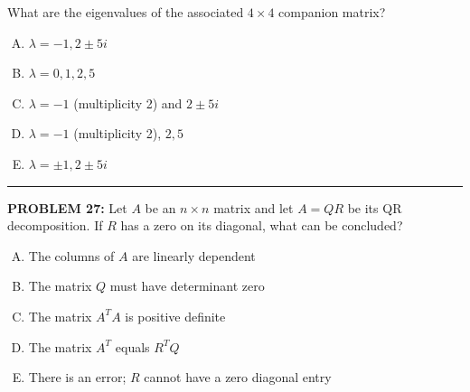 \documentclass[12pt]{amsart}
\newcommand{\divider}{
  \vspace{-1em} %
  \noindent
  \raisebox{-0.15ex}{\textbullet}%
  \hspace{0.5em}%
  \rule[0.5ex]{0.95\textwidth}{1.0pt}%
  \hspace{0.5em}%
  \raisebox{-0.15ex}{\textbullet}%
  \vspace{0em} %
}
\begin{document}
{What are the eigenvalues of the associated $4 \times 4$ companion matrix?

\begin{enumerate}[(A)]
\item $\lambda = -1, 2\pm 5i$
\item $\lambda = 0, 1, 2, 5$
\item $\lambda = -1$ (multiplicity 2) and $2 \pm 5i$
\item $\lambda = -1$ (multiplicity 2), $2, 5$
\item $\lambda = \pm 1, 2\pm 5i$
\end{enumerate}


\divider



{\bf PROBLEM 27:}
% 
Let $A$ be an $n \times n$ matrix and let $A = QR$ be its QR decomposition.
If $R$ has a zero on its diagonal, what can be concluded?
\begin{enumerate}[(A)]
\item The columns of $A$ are linearly dependent
\item The matrix $Q$ must have determinant zero
\item The matrix $A^TA$ is positive definite
\item The matrix $A^T$ equals $R^TQ$
\item There is an error; $R$ cannot have a zero diagonal entry
\end{enumerate}

}
\end{document}
